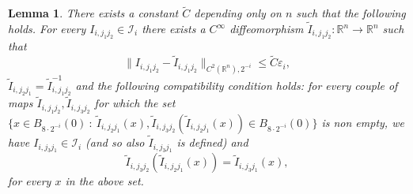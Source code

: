 \documentclass[11pt]{article}
\newcommand{\eps}{\varepsilon}
\newcommand{\rr}{\mathbb{R}}
\theoremstyle{plain}
\newtheorem{lemma}[theorem]{Lemma}
\theoremstyle{definition}
\numberwithin{equation}{section}
\begin{document}
\begin{lemma}\label{bigmodification}
There exists a constant $\tilde C$ depending only on $n$ such that the following holds.
 For every $I_{i,j_1j_2}\in \mathcal I_i$  there exists a $C^\infty$ diffeomorphism $\widetilde I_{i,j_1j_2}:\rr^n \to \rr^n$ such that 
	\begin{equation}\label{finalb}
		\|I_{i,j_1j_2}-\widetilde I_{i,j_1j_2} \|_{C^2(\rr^n),2^{-i}}\le \tilde C \eps_i,
	\end{equation}
	$\widetilde I_{i,j_2j_1}=\widetilde I_{i,j_1j_2}^{-1}$ and the following compatibility condition holds:
	for every couple of maps $\tilde I_{i,j_1j_2},\tilde I_{i,j_3j_2}$ for which the set  $\{x \in B_{8\cdot 2^{-i}}(0) \ : \ \tilde I_{i,j_2j_1}(x),\tilde I_{i,j_3j_2}(\tilde I_{i,j_2j_1}(x))\in B_{8\cdot 2^{-i}}(0)\}$ is non empty, we have $I_{i,j_3j_1}\in \mathcal I_i$ (and so also $\tilde I_{i,j_3j_1}$ is defined)  and 
	\[  \tilde I_{i,j_3j_2}(\tilde I_{i,j_2j_1}(x))=\tilde I_{i,j_3j_1}(x),\]
	for every $x$ in the above set.
\end{lemma}
\end{document}
